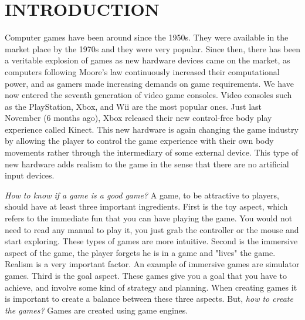 \chapter{INTRODUCTION}\label{chap1}








Computer games have been around since the 1950s\cite{historyVideoGames}. They were available in the market place by the 1970s and they were very popular. Since then, there has been a veritable explosion of games as new hardware devices came on the market, as computers following Moore's law continuously increased their computational power, and as gamers made increasing demands on game requirements. We have now entered the seventh generation of video game consoles\cite{usingVideoGames}. Video consoles such as the PlayStation, Xbox, and Wii are the most popular ones. Just last November (6 months ago), Xbox released their new control-free body play experience called Kinect\cite{kinect}. This new hardware is again changing the game industry by allowing the player to control the game experience with their own body movements rather through the intermediary of some external device. This type of new hardware adds realism to the game in the sense that there are no artificial input devices.

\textit{How to know if a game is a good game?} A game, to be attractive to players, should have at least three important ingredients\cite{bookGameKit2}. First is the toy aspect, which refers to the immediate fun that you can have playing the game. You would not need to read any manual to play it, you just grab the controller or the mouse and start exploring. These types of games are more intuitive. Second is the immersive aspect of the game, the player forgets he is in a game and "lives" the game. Realism is a very important factor. An example of immersive games are simulator games. Third is the goal aspect. These games give you a goal that you have to achieve, and involve some kind of strategy and planning. When creating games it is important to create a balance between these three aspects. But, \textit{how to create the games?} Games are created using game engines.

